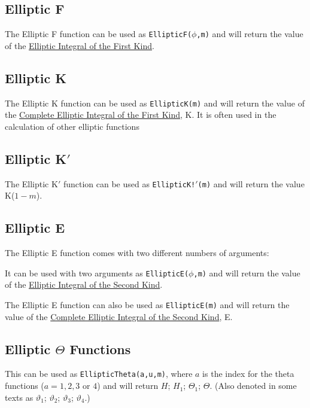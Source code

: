 \subsection{Elliptic F}

The Elliptic F function can be used as {\tt EllipticF($\phi$,m)} and
will return the value of the {\underline {Elliptic Integral of the
First Kind}}.

\subsection{Elliptic K}

The Elliptic K function can be used as {\tt EllipticK(m)} and will
return the value of the {\underline {Complete Elliptic Integral of the
First Kind}}, K. It is often used in the calculation of other elliptic
functions

\subsection{Elliptic K$'$}

The Elliptic K$'$ function can be used as {\tt EllipticK!$'$(m)} and will
return the value K($1-m$).

\subsection{Elliptic E}

The Elliptic E function comes with two different numbers of arguments:

It can be used with two arguments as {\tt EllipticE($\phi$,m)}
and will return the value
of the {\underline {Elliptic Integral of the Second Kind}}.

The Elliptic E function can also be used as {\tt EllipticE(m)} and
will return the value of the {\underline {Complete Elliptic Integral
of the Second Kind}}, E.

%
%
\subsection{Elliptic $\Theta$ Functions}

This can be used as {\tt EllipticTheta(a,u,m)}, where $a$ is the index
for the theta functions ($a = 1,2,3$ or $4$) and will return $H$;
$H_1$; $\Theta_1$; $\Theta$. (Also denoted in some texts as
$\vartheta_1$; $\vartheta_2$; $\vartheta_3$; $\vartheta_4$.)

